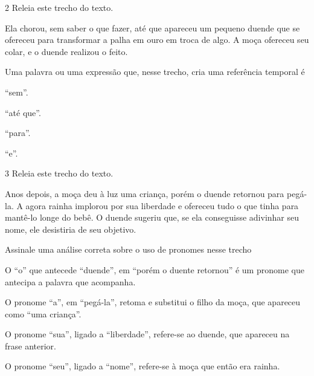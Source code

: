 \num{2} Releia este trecho do texto.

\begin{myquote}
Ela chorou, sem saber o que fazer, até que apareceu um pequeno duende que se
ofereceu para transformar a palha em ouro em troca de algo. A moça
ofereceu seu colar, e o duende realizou o feito.
\end{myquote}

Uma palavra ou uma expressão que, nesse trecho, cria uma referência temporal é

\begin{minipage}{.5\textwidth}
\begin{escolha}
\item “sem”.

\item “até que”.

\item “para”.

\item “e”.
\end{escolha}
\end{minipage}



\num{3} Releia este trecho do texto.

\begin{myquote}
Anos depois, a moça deu à luz uma criança, porém o duende retornou para
pegá-la. A agora rainha implorou por sua liberdade e ofereceu tudo o que
tinha para mantê-lo longe do bebê. O duende sugeriu que, se ela
conseguisse adivinhar seu nome, ele desistiria de seu objetivo.
\end{myquote}

Assinale uma análise correta sobre o uso de pronomes nesse trecho

\begin{escolha}
\item O “o” que antecede “duende”, em “porém o duente retornou” é um pronome que antecipa a palavra que acompanha.

\item O pronome “a”, em “pegá-la”, retoma e substitui o filho da moça, que apareceu como “uma criança”.

\item O pronome “sua”, ligado a “liberdade”, refere-se ao duende, que apareceu na frase anterior.

\item O pronome “seu”, ligado a “nome”, refere-se à moça que então era rainha.
\end{escolha}







